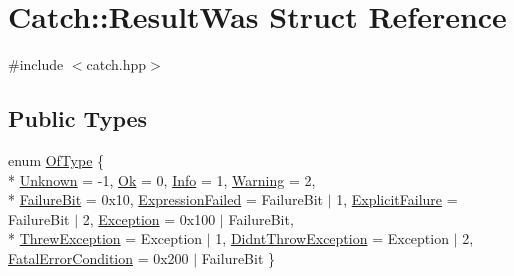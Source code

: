 \hypertarget{structCatch_1_1ResultWas}{\section{Catch\-:\-:Result\-Was Struct Reference}
\label{structCatch_1_1ResultWas}
}


{\ttfamily \#include $<$catch.\-hpp$>$}

\subsection*{Public Types}
\begin{DoxyCompactItemize}
\item 
enum \hyperlink{structCatch_1_1ResultWas_a624e1ee3661fcf6094ceef1f654601ef}{Of\-Type} \{ \\*
\hyperlink{structCatch_1_1ResultWas_a624e1ee3661fcf6094ceef1f654601efa65721dda02fe5efb522e7449e496608a}{Unknown} = -\/1, 
\hyperlink{structCatch_1_1ResultWas_a624e1ee3661fcf6094ceef1f654601efae7cbe89bb9ec7ece9b44d48b63d01b63}{Ok} = 0, 
\hyperlink{structCatch_1_1ResultWas_a624e1ee3661fcf6094ceef1f654601efa30222063929ca1b6318faa78e8242f1c}{Info} = 1, 
\hyperlink{structCatch_1_1ResultWas_a624e1ee3661fcf6094ceef1f654601efa67e9d36ba0f04a60a19896834d840c21}{Warning} = 2, 
\\*
\hyperlink{structCatch_1_1ResultWas_a624e1ee3661fcf6094ceef1f654601efa1818f1b198f10b5734c405142b22025c}{Failure\-Bit} = 0x10, 
\hyperlink{structCatch_1_1ResultWas_a624e1ee3661fcf6094ceef1f654601efa5e7126b8458dc1376ac870a719f7873f}{Expression\-Failed} = Failure\-Bit $\vert$ 1, 
\hyperlink{structCatch_1_1ResultWas_a624e1ee3661fcf6094ceef1f654601efacecfc052e2499499b13304249303cc36}{Explicit\-Failure} = Failure\-Bit $\vert$ 2, 
\hyperlink{structCatch_1_1ResultWas_a624e1ee3661fcf6094ceef1f654601efaa9107b7836cc7590ca668002f76d27c7}{Exception} = 0x100 $\vert$ Failure\-Bit, 
\\*
\hyperlink{structCatch_1_1ResultWas_a624e1ee3661fcf6094ceef1f654601efa3bb56296483947280cf7fa1ad074ab45}{Threw\-Exception} = Exception $\vert$ 1, 
\hyperlink{structCatch_1_1ResultWas_a624e1ee3661fcf6094ceef1f654601efa8b6d3d5bc78d4e7a95543b6ecfbdb57d}{Didnt\-Throw\-Exception} = Exception $\vert$ 2, 
\hyperlink{structCatch_1_1ResultWas_a624e1ee3661fcf6094ceef1f654601efa87fa1f2a2a63290b61948002e2935377}{Fatal\-Error\-Condition} = 0x200 $\vert$ Failure\-Bit
 \}
\end{DoxyCompactItemize}


